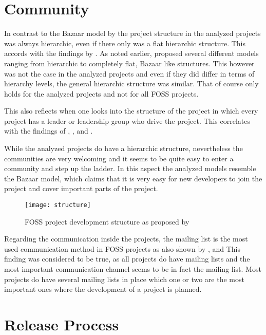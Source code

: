 
\section{Community} %

In contrast to the Bazaar model by \textcite{Raymond1998} the project
structure in the analyzed projects was always hierarchic, even if there only
was a flat hierarchic structure. This accords with the findings by
\textcite{Crowston2005}. As noted earlier, \textcite{Ghosh2005} proposed
several different models ranging from hierarchic to completely flat,
Bazaar like structures. This however was not the case in the analyzed projects
and even if they did differ in terms of hierarchy levels, the general
hierarchic structure was similar. That of course only holds for the analyzed
projects and not for all \ac{FOSS} projects.

This also reflects when one looks into the structure of the project in which
every project has a leader or leadership group who drive the project. This
correlates with the findings of \textcite{Johnson2001},
\textcite{Crowston2005a}, \textcite{Warsta2003} and
\textcite{Krishnamurthy2002}.

While the analyzed projects do have a hierarchic structure, nevertheless the
communities are very welcoming and it seems to be quite easy to enter a
community and step up the ladder. In this aspect the analyzed models resemble
the Bazaar model, which claims that it is very easy for new developers
to join the project and cover important parts of the project.

\begin{figure}[htbp]
  \centering
  \texttt{[image: structure]}
  \caption{\acl{FOSS} project development structure as proposed by \textcite{Crowston2005}}
\end{figure}

Regarding the communication inside the projects, the mailing list is the most
used communication method in \ac{FOSS} projects as also shown by
\textcite{Schweik2003}, \textcite{Ogawa2007} and \textcite{Kim2003} This
finding was considered to be true, as all projects do have mailing lists and
the most important communication channel seems to be in fact the mailing list.
Most projects do have several mailing lists in place which one or two are the
most important ones where the development of a project is planned.


\section{Release Process} %

